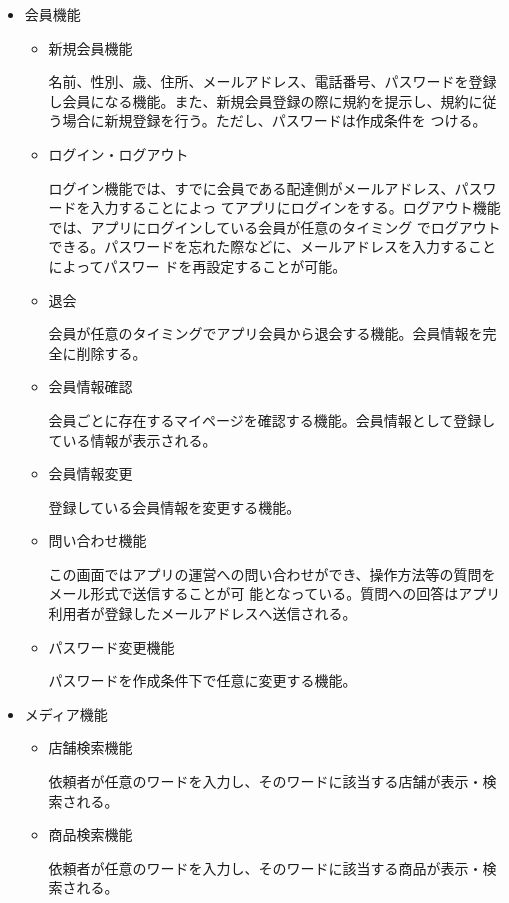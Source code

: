 \begin{itemize}
  \item 会員機能
    \begin{itemize}
        \item 新規会員機能
        
        名前、性別、歳、住所、メールアドレス、電話番号、パスワードを登録し会員になる機能。また、新規会員登録の際に規約を提示し、規約に従う場合に新規登録を行う。ただし、パスワードは作成条件を つける。
        \item ログイン・ログアウト
        
        ログイン機能では、すでに会員である配達側がメールアドレス、パスワードを入力することによっ てアプリにログインをする。ログアウト機能では、アプリにログインしている会員が任意のタイミング でログアウトできる。パスワードを忘れた際などに、メールアドレスを入力することによってパスワー ドを再設定することが可能。
        \item 退会
        
        会員が任意のタイミングでアプリ会員から退会する機能。会員情報を完全に削除する。
        \item 会員情報確認

        会員ごとに存在するマイページを確認する機能。会員情報として登録している情報が表示される。
        \item 会員情報変更
        
        登録している会員情報を変更する機能。
        \item 問い合わせ機能
        
        この画面ではアプリの運営への問い合わせができ、操作方法等の質問をメール形式で送信することが可 能となっている。質問への回答はアプリ利用者が登録したメールアドレスへ送信される。
        \item パスワード変更機能
        
        パスワードを作成条件下で任意に変更する機能。

    \end{itemize}

  \item メディア機能
    \begin{itemize}
        \item 店舗検索機能
        
        依頼者が任意のワードを入力し、そのワードに該当する店舗が表示・検索される。
        
        \item 商品検索機能
        
        依頼者が任意のワードを入力し、そのワードに該当する商品が表示・検索される。


\end{itemize}
\end{itemize}
